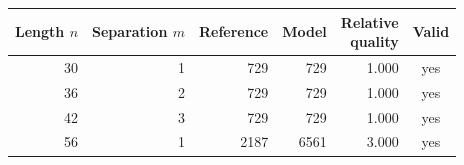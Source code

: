 \begin{center}\begin{minipage}{\linewidth}\centering\small
\begin{tabular}{@{}rrrrrc@{}}
\toprule
Length $n$ & Separation $m$ & Reference & Model & \shortstack{Relative\\quality} & Valid \\
\midrule
30 & 1 & 729 & 729 & 1.000 & yes \\
36 & 2 & 729 & 729 & 1.000 & yes \\
42 & 3 & 729 & 729 & 1.000 & yes \\
56 & 1 & 2187 & 6561 & 3.000 & yes \\
\bottomrule
\end{tabular}
\label{tab:codes}
\end{minipage}\end{center}
